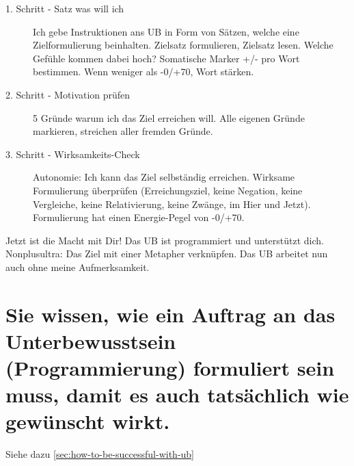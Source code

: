 \begin{description}
	\item[1. Schritt - Satz was will ich] Ich gebe Instruktionen ans UB in Form von Sätzen, welche eine Zielformulierung beinhalten. Zielsatz formulieren, Zielsatz lesen. Welche Gefühle kommen dabei hoch? Somatische Marker +/- pro Wort bestimmen. Wenn weniger als -0/+70, Wort stärken.
	\item[2. Schritt - Motivation prüfen] 5 Gründe warum ich das Ziel erreichen will. Alle eigenen Gründe markieren, streichen aller fremden Gründe.
	\item[3. Schritt - Wirksamkeits-Check] Autonomie: Ich kann das Ziel selbständig erreichen. Wirksame Formulierung überprüfen (Erreichungsziel, keine Negation, keine Vergleiche, keine Relativierung, keine Zwänge, im Hier und Jetzt). Formulierung hat einen Energie-Pegel von -0/+70. 
\end{description}

Jetzt ist die Macht mit Dir! Das UB ist programmiert und unterstützt dich.
Nonplusultra: Das Ziel mit einer Metapher verknüpfen. Das UB arbeitet nun auch ohne meine Aufmerksamkeit.

\section{Sie wissen, wie ein Auftrag an das Unterbewusstsein (Programmierung) formuliert sein muss, damit es auch tatsächlich wie gewünscht wirkt.}

Siehe dazu \ref{sec:how-to-be-successful-with-ub}
	